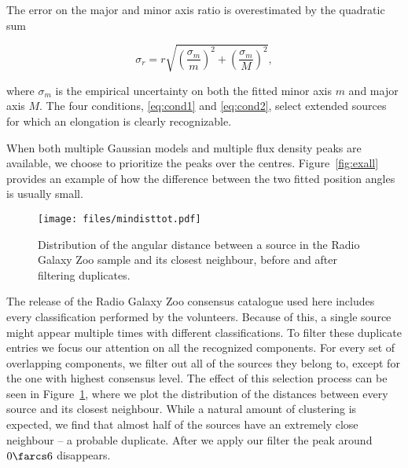 \begin{description}
			The error on the major and minor axis ratio is overestimated by the quadratic sum
			
			
			\begin{equation}
			\sigma_r = r\sqrt{\left(
				\frac{\sigma_m}{m}
				\right)^2
				+
				\left( 
				\frac{\sigma_m}{M}
				\right)^2},
			\end{equation}
			
			
			where $\sigma_m$ is the empirical uncertainty on both the fitted minor axis $m$ and major axis $M$. The four conditions, \eqref{eq:cond1} and \eqref{eq:cond2}, select extended sources for which an elongation is clearly recognizable.
			
			\end{description}
	
			When both multiple Gaussian models and multiple flux density peaks are available, we choose to prioritize the peaks over the centres. Figure~\ref{fig:exall} provides an example of how the difference between the two fitted position angles is usually small.
	
			
			\begin{figure}
				\centering
				\texttt{[image: files/mindisttot.pdf]}
				\caption{Distribution of the angular distance between a source in the Radio Galaxy Zoo sample and its closest neighbour, before and after filtering duplicates.}
				\label{fig:mindist}
			\end{figure} 
			
			The release of the Radio Galaxy Zoo consensus catalogue used here includes every classification performed by the volunteers. Because of this, a single source might appear multiple times with different classifications. 
            To filter these duplicate entries we focus our attention on all the recognized components. For every set of overlapping components, we filter out all of the sources they belong to, except for the one with highest consensus level. The effect of this selection process can be seen in Figure~\ref{fig:mindist}, where we plot the distribution of the distances between every source and its closest neighbour. While a natural amount of clustering is expected, we find that almost half of the sources have an extremely close neighbour -- a probable duplicate. After we apply our filter the peak around $0\farcs6$ disappears.
            
